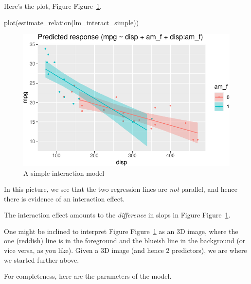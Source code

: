 \documentclass[
  letterpaper,
  DIV=11,
  numbers=noendperiod]{scrreprt}
\newenvironment{Shaded}{\begin{snugshade}}{\end{snugshade}}
\newcommand{\FunctionTok}[1]{\textcolor[rgb]{0.28,0.35,0.67}{#1}}
\newcommand{\NormalTok}[1]{\textcolor[rgb]{0.00,0.23,0.31}{#1}}
\theoremstyle{definition}
\theoremstyle{definition}
\theoremstyle{remark}
\begin{document}
Here's the plot, Figure Figure~\ref{fig-interact-simple}.

\begin{Shaded}
\begin{Highlighting}[]
\FunctionTok{plot}\NormalTok{(}\FunctionTok{estimate\_relation}\NormalTok{(lm\_interact\_simple))}
\end{Highlighting}
\end{Shaded}

\begin{figure}[H]

{\centering \includegraphics{./regression2_files/figure-pdf/fig-interact-simple-1.pdf}

}

\caption{\label{fig-interact-simple}A simple interaction model}

\end{figure}

In this picture, we see that the two regression lines are \emph{not}
parallel, and hence there is evidence of an interaction effect.

The interaction effect amounts to the \emph{difference} in slops in
Figure Figure~\ref{fig-interact-simple}.

One might be inclined to interpret Figure
Figure~\ref{fig-interact-simple} as an 3D image, where the one (reddish)
line is in the foreground and the blueish line in the background (or
vice versa, as you like). Given a 3D image (and hence 2 predictors), we
are where we started further above.

For completeness, here are the parameters of the model.
\end{document}
